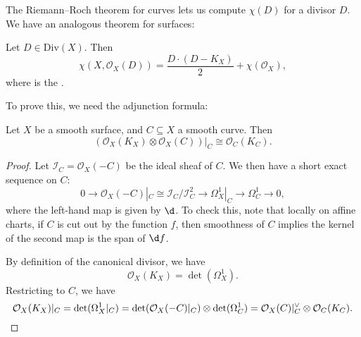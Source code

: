\documentclass[a4paper]{article}
\newcommand\Div{\mathrm{Div}}
\begin{document}
The Riemann--Roch theorem for curves lets us compute $\chi(D)$ for a divisor $D$. We have an analogous theorem for surfaces:
\begin{thm}
  Let $D \in \Div(X)$. Then
  \[
    \chi(X, \mathcal{O}_X(D)) = \frac{D \cdot (D - K_X)}{2} + \chi(\mathcal{O}_X),
  \]
  where  is the .
\end{thm}

To prove this, we need the adjunction formula:
\begin{thm}
  Let $X$ be a smooth surface, and $C \subseteq X$ a smooth curve. Then
  \[
    (\mathcal{O}_X(K_X) \otimes \mathcal{O}_X(C))|_C \cong \mathcal{O}_C(K_C).
  \]
\end{thm}

\begin{proof}
  Let $\mathcal{I}_C = \mathcal{O}_X(-C)$ be the ideal sheaf of $C$. We then have a short exact sequence on $C$:
  \[
    0 \to \mathcal{O}_X(-C)|_C \cong \mathcal{I}_C/\mathcal{I}_C^2 \to \Omega^1_X|_C \to \Omega^1_C \to 0,
  \]
  where the left-hand map is given by $\d$. To check this, note that locally on affine charts, if $C$ is cut out by the function $f$, then smoothness of $C$ implies the kernel of the second map is the span of $\d f$.

  By definition of the canonical divisor, we have
  \[
    \mathcal{O}_X(K_X) = \det (\Omega^1_X).
  \]
  Restricting to $C$, we have
  \[
    \mathcal{O}_X(K_X)|_C = \det(\Omega^1_X|_C) = \det(\mathcal{O}_X(-C)|_C) \otimes \det(\Omega^1_C) = \mathcal{O}_X(C)|_C^\vee \otimes \mathcal{O}_C(K_C).\qedhere
  \]
\end{proof}
\end{document}
